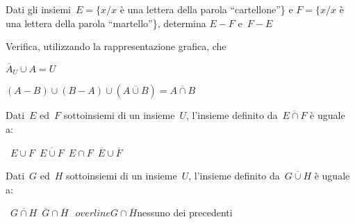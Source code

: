 
\begin{esercizio}
\label{ese:7.14}
Dati gli insiemi~\(E=\{x / x\) è una lettera della parola ``cartellone''\} e
\(F=\{x / x\) è una lettera della parola ``martello''\}, determina
\(E-F\) e~\(F-E\)
\end{esercizio}


\begin{esercizio}
\label{ese:7.15}
Verifica, utilizzando la rappresentazione grafica, che
 \begin{enumeratea}
 \item \(\overline{A}_{U}\cup A=U\)
 \item \((A-B)\cup (B-A)\cup (\overline{A\cup B})=\overline{{A\cap B}}\)
 \end{enumeratea}
\end{esercizio}

\begin{esercizio}
 \label{ese:7.16}
Dati~\(E\) ed~\(F\) sottoinsiemi di un insieme~\(U\), l'insieme
definito da~\(\overline{E\cap F}\) è uguale a:
\begin{center}
\boxA\quad~\(E\cup F\)\quad\boxB\quad~\(\overline{E\cup 
F}\)\quad\boxC\quad~\(E\cap 
F\)\quad\boxD\quad~\(\overline{E}\cup\overline{F}\)
\end{center}
\end{esercizio}

\begin{esercizio}
 \label{ese:7.17}
Dati~\(G\) ed~\(H\) sottoinsiemi di un insieme~\(U\), l'insieme
definito da~\(\overline{G\cup H}\) è uguale a:
\begin{center}
\boxA\quad~\(\overline{{G\cap 
H}}\)\quad\boxB\quad~\(\overline{G}\cap\overline{H}\)\quad\boxC\quad~\(\
overline{{
G\cap \overline{H}}}\)\quad\boxD\quad nessuno dei precedenti
\end{center}
\end{esercizio}

